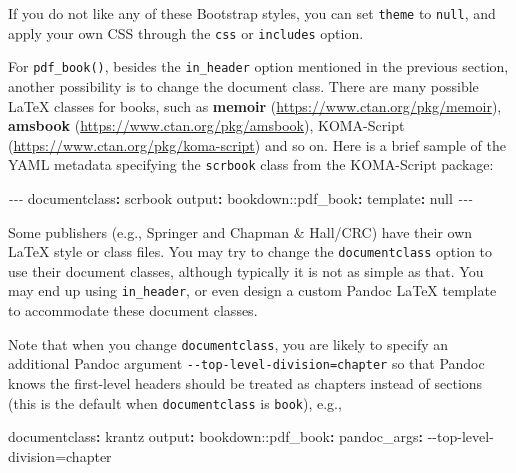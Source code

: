 \documentclass[
  12pt,
]{krantz}
\newenvironment{Shaded}{\begin{snugshade}}{\end{snugshade}}
\newcommand{\AttributeTok}[1]{\textcolor[rgb]{0.77,0.63,0.00}{#1}}
\newcommand{\CharTok}[1]{\textcolor[rgb]{0.31,0.60,0.02}{#1}}
\newcommand{\FunctionTok}[1]{\textcolor[rgb]{0.00,0.00,0.00}{#1}}
\newcommand{\KeywordTok}[1]{\textcolor[rgb]{0.13,0.29,0.53}{\textbf{#1}}}
\newcommand{\PreprocessorTok}[1]{\textcolor[rgb]{0.56,0.35,0.01}{\textit{#1}}}
\theoremstyle{definition}
\theoremstyle{definition}
\theoremstyle{definition}
\theoremstyle{definition}
\theoremstyle{remark}
\begin{document}
If you do not like any of these Bootstrap styles, you can set \texttt{theme} to \texttt{null}, and apply your own CSS through the \texttt{css} or \texttt{includes} option.

For \texttt{pdf\_book()}, besides the \texttt{in\_header} option mentioned in the previous section, another possibility is to change the document class. There are many possible LaTeX classes for books, such as \textbf{memoir} (\url{https://www.ctan.org/pkg/memoir}), \textbf{amsbook} (\url{https://www.ctan.org/pkg/amsbook}), KOMA-Script (\url{https://www.ctan.org/pkg/koma-script}) and so on. Here is a brief sample of the YAML metadata specifying the \texttt{scrbook} class from the KOMA-Script package:

\begin{Shaded}
\begin{Highlighting}[]
\PreprocessorTok{{-}{-}{-}}
\FunctionTok{documentclass}\KeywordTok{:}\AttributeTok{ scrbook}
\FunctionTok{output}\KeywordTok{:}
\AttributeTok{  bookdown:}\FunctionTok{:pdf\_book}\KeywordTok{:}
\AttributeTok{    }\FunctionTok{template}\KeywordTok{:}\AttributeTok{ }\CharTok{null}
\PreprocessorTok{{-}{-}{-}}
\end{Highlighting}
\end{Shaded}

Some publishers (e.g., Springer and Chapman \& Hall/CRC) have their own LaTeX style or class files. You may try to change the \texttt{documentclass} option to use their document classes, although typically it is not as simple as that. You may end up using \texttt{in\_header}, or even design a custom Pandoc LaTeX template to accommodate these document classes.

Note that when you change \texttt{documentclass}, you are likely to specify an additional Pandoc argument \texttt{-\/-top-level-division=chapter} so that Pandoc knows the first-level headers should be treated as chapters instead of sections (this is the default when \texttt{documentclass} is \texttt{book}), e.g.,

\begin{Shaded}
\begin{Highlighting}[]
\FunctionTok{documentclass}\KeywordTok{:}\AttributeTok{ krantz}
\FunctionTok{output}\KeywordTok{:}
\AttributeTok{  bookdown:}\FunctionTok{:pdf\_book}\KeywordTok{:}
\AttributeTok{    }\FunctionTok{pandoc\_args}\KeywordTok{:}\AttributeTok{ {-}{-}top{-}level{-}division=chapter}
\end{Highlighting}
\end{Shaded}
\end{document}

